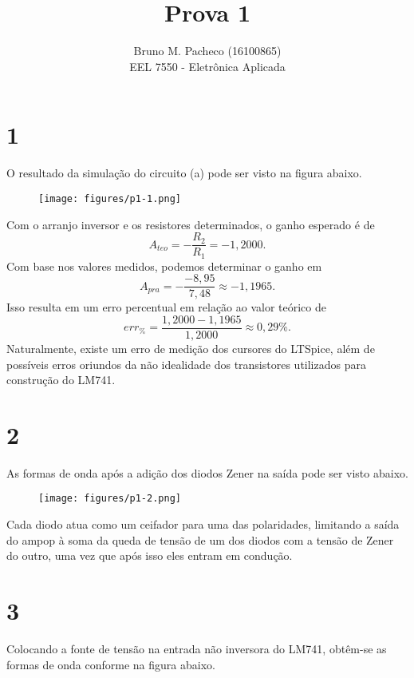 \documentclass[a4paper]{report}
\begin{document}
 
\title{Prova 1}
\author{Bruno M. Pacheco (16100865)\\
EEL 7550 - Eletrônica Aplicada}
 
\maketitle

\section*{1}

O resultado da simulação do circuito (a) pode ser visto na figura abaixo.

\begin{figure}[H]
    \centering
    \texttt{[image: figures/p1-1.png]}
\end{figure}

Com o arranjo inversor e os resistores determinados, o ganho esperado é de \[
A_{teo} = - \frac{R_2}{R_1} = -1,2000
.\] Com base nos valores medidos, podemos determinar o ganho em \[
A_{pra} = - \frac{-8,95}{7,48} \approx -1,1965
.\] Isso resulta em um erro percentual em relação ao valor teórico de \[
err_{\%} = \frac{1,2000 - 1,1965}{1,2000} \approx 0,29 \%
.\] Naturalmente, existe um erro de medição dos cursores do LTSpice, além de possíveis erros oriundos da não idealidade dos transistores utilizados para construção do LM741.

\section*{2}

As formas de onda após a adição dos diodos Zener na saída pode ser visto abaixo.

\begin{figure}[H]
    \centering
    \texttt{[image: figures/p1-2.png]}
\end{figure}

Cada diodo atua como um ceifador para uma das polaridades, limitando a saída do ampop à soma da queda de tensão de um dos diodos com a tensão de Zener do outro, uma vez que após isso eles entram em condução.

\section*{3}

Colocando a fonte de tensão na entrada não inversora do LM741, obtêm-se as formas de onda conforme na figura abaixo.
\end{document}
